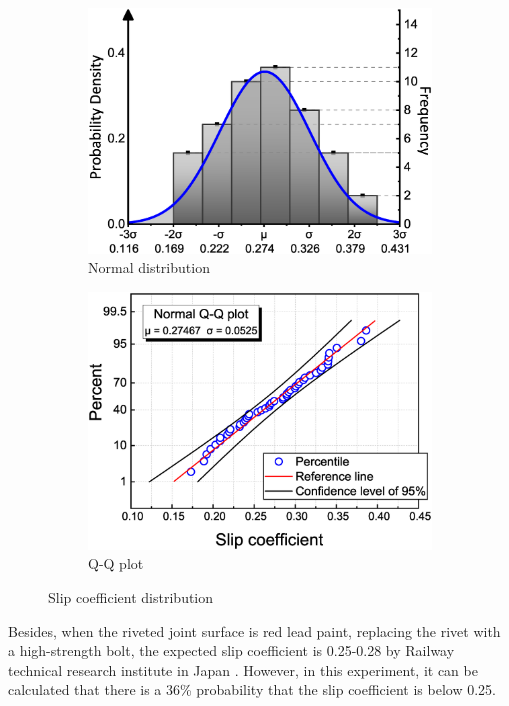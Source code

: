 \begin{figure}
    \centering
    \begin{subfigure}[t]{0.48\textwidth}
    \includegraphics[width=\linewidth]{imgs/ch3/fig10a.eps}
    \caption{Normal distribution}
    \label{ch3fig10a}  
    \end{subfigure}
    \hfill
    \begin{subfigure}[t]{0.48\textwidth}
    \includegraphics[width=\linewidth]{imgs/ch3/fig10b.eps}
    \caption{Q-Q plot}
    \label{ch3fig10b}  
    \end{subfigure}
    \caption{Slip coefficient distribution}
    \label{ch3fig10} 
\end{figure}

Besides, when the riveted joint surface is red lead paint, replacing the rivet with a high-strength bolt, the expected slip coefficient is 0.25-0.28 by Railway technical research institute in Japan \cite{rtri1992Manual}. However, in this experiment, it can be calculated that there is a 36\% probability that the slip coefficient is below 0.25. 

